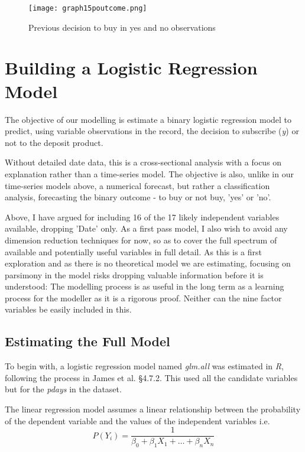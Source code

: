 \documentclass[9pt,technote]{IEEEtran}
\begin{document}
\begin{figure}[htbp]
\centerline{\texttt{[image: graph15poutcome.png]}}
\caption{Previous decision to buy in yes and no observations}
\label{fig:graph15poutcome}
\end{figure}

\section{Building a Logistic Regression Model}

The objective of our modelling is estimate a binary logistic regression model to predict, using variable observations in the record, the decision to subscribe (\textit{y}) or not to the deposit product.  

Without detailed date data, this is a cross-sectional analysis with a focus on explanation rather than a time-series model.  The objective is also, unlike in our time-series models above, a numerical forecast, but rather a classification analysis, forecasting the binary outcome - to buy or not buy, 'yes' or 'no'.  

Above, I have argued for including 16 of the 17 likely independent variables available, dropping 'Date' only.  As a first pass model, I also wish to avoid any dimension reduction techniques for now, so as to cover the full spectrum of available and potentially useful variables in full detail.  As this is a first exploration and as there is no theoretical model we are estimating, focusing on parsimony in the model risks dropping valuable information before it is understood: The modelling process is as useful in the long term as a learning process for the modeller as it is a rigorous proof.  Neither can the nine factor variables be easily included in this.  

\subsection{Estimating the Full Model}

To begin with, a logistic regression model named \textit{glm.all} was estimated in \textit{R}, following the process in James et al. \cite{hastie21} \S 4.7.2.  This used  all the candidate variables but for the \textit{pdays} in the dataset.  

The linear regression model assumes a linear relationship between the probability of the dependent variable and the values of the independent variables i.e.
\begin{equation}
P(Y_i) = \frac{1}{\beta_0 + \beta_1 X_1 + \dots +\beta_n X_n}
\end{equation}
\end{document}
